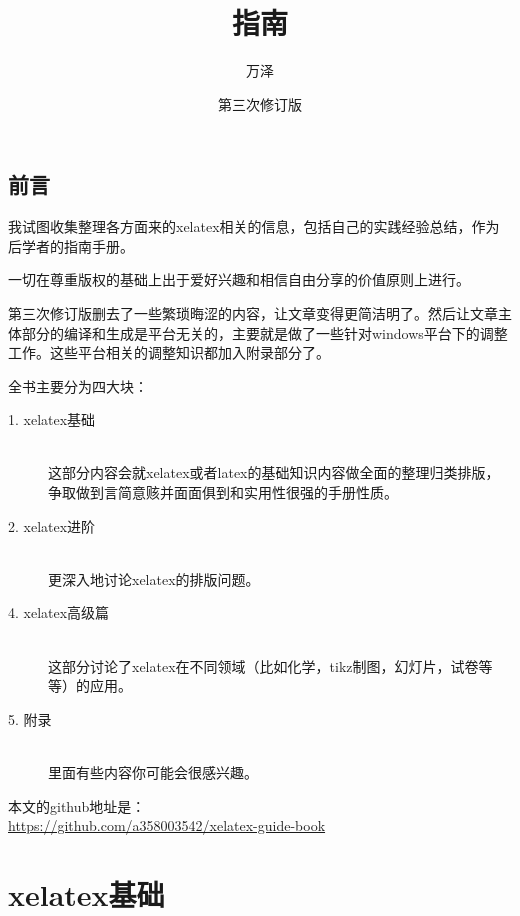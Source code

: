 \documentclass[11pt,oneside]{book}
\begin{document}
\frontmatter


\title{\XeLaTeX 指南}
\author{万泽}
\date{第三次修订版}
\maketitle






\chapter*{前言}

我试图收集整理各方面来的xelatex相关的信息，包括自己的实践经验总结，作为后学者的指南手册。

一切在尊重版权的基础上出于爱好兴趣和相信自由分享的价值原则上进行。

第三次修订版删去了一些繁琐晦涩的内容，让文章变得更简洁明了。然后让文章主体部分的编译和生成是平台无关的，主要就是做了一些针对windows平台下的调整工作。这些平台相关的调整知识都加入附录部分了。


全书主要分为四大块：
\begin{description}
\item[1. xelatex基础] \hfill \\
  这部分内容会就xelatex或者latex的基础知识内容做全面的整理归类排版，争取做到言简意赅并面面俱到和实用性很强的手册性质。

\item[2. xelatex进阶] \hfill \\
  更深入地讨论xelatex的排版问题。

\item[4. xelatex高级篇] \hfill \\
  这部分讨论了xelatex在不同领域（比如化学，tikz制图，幻灯片，试卷等等）的应用。

\item[5. 附录] \hfill \\
  里面有些内容你可能会很感兴趣。
\end{description}


本文的github地址是：\\
\href{https://github.com/a358003542/xelatex-guide-book}{https://github.com/a358003542/xelatex-guide-book}



\setcounter{tocdepth}{2}
\tableofcontents


\mainmatter
\part{xelatex基础}
\end{document}
